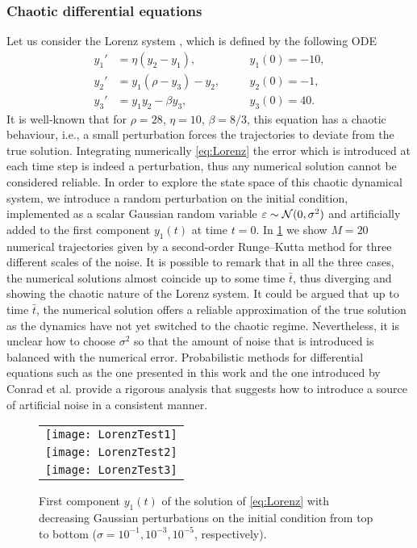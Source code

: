 \documentclass[10pt]{article}
\begin{document}
\subsubsection*{Chaotic differential equations} Let us consider the Lorenz system \cite{Lor63}, which is defined by the following ODE
\begin{equation}\label{eq:Lorenz}
\begin{aligned}
	y_1' &= \eta(y_2 - y_1), \quad &&y_1(0) = -10,\\
	y_2' &= y_1(\rho - y_3) - y_2, \quad &&y_2(0) = -1,\\
	y_3' &= y_1y_2 - \beta y_3, \quad &&y_3(0) = 40.
\end{aligned}
\end{equation}
It is well-known that for $\rho=28$, $\eta=10$, $\beta=8/3$, this equation has a chaotic behaviour, i.e., a small perturbation forces the trajectories to deviate from the true solution. Integrating numerically \eqref{eq:Lorenz} the error which is introduced at each time step is indeed a perturbation, thus any numerical solution cannot be considered reliable. In order to explore the state space of this chaotic dynamical system, we introduce a random perturbation on the initial condition, implemented as a scalar Gaussian random variable $\varepsilon \sim \mathcal{N}(0, \sigma^2)$ and artificially added to the first component ${y_1(t)}$ at time $t = 0$. In \cref{fig:LorenzTest} we show $M = 20$ numerical trajectories given by a second-order Runge--Kutta method for three different scales of the noise. It is possible to remark that in all the three cases, the numerical solutions almost coincide up to some time $\bar t$, thus diverging and showing the chaotic nature of the Lorenz system. It could be argued that up to time $\bar t$, the numerical solution offers a reliable approximation of the true solution as the dynamics have not yet switched to the chaotic regime. Nevertheless, it is unclear how to choose ${\sigma^2}$ so that the amount of noise that is introduced is balanced with the numerical error. Probabilistic methods for differential equations such as the one presented in this work and the one introduced by Conrad et al. \cite{CGS17} provide a rigorous analysis that suggests how to introduce a source of artificial noise in a consistent manner.
 
\begin{figure}
	\begin{center}
		\begin{tabular}{c}
			\texttt{[image: LorenzTest1]} \\
			\texttt{[image: LorenzTest2]} \\
			\texttt{[image: LorenzTest3]}
		\end{tabular}
	\end{center}
	\caption{First component {$y_1(t)$} of the solution of \eqref{eq:Lorenz} with decreasing Gaussian perturbations on the initial condition from top to bottom {($\sigma = 10^{-1}, 10^{-3}, 10^{-5}$, respectively)}.}
	\label{fig:LorenzTest}
\end{figure}
\end{document}
